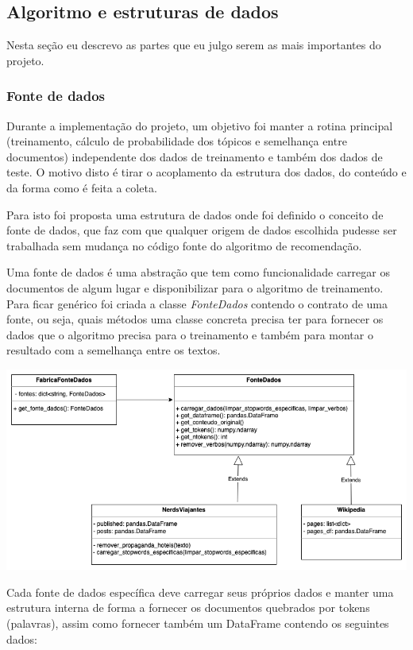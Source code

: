 \subsection{Algoritmo e estruturas de dados}

Nesta seção eu descrevo as partes que eu julgo serem as mais importantes do projeto.

\subsubsection{Fonte de dados}
Durante a implementação do projeto, um objetivo foi manter a rotina principal (treinamento, cálculo de probabilidade dos tópicos e semelhança entre documentos) independente dos dados de treinamento e também dos dados de teste. O motivo disto é tirar o acoplamento da estrutura dos dados, do conteúdo e da forma como é feita a coleta.

Para isto foi proposta uma estrutura de dados onde foi definido o conceito de fonte de dados, que faz com que qualquer origem de dados escolhida pudesse ser trabalhada sem mudança no código fonte do algoritmo de recomendação.

Uma fonte de dados é uma abstração que tem como funcionalidade carregar os documentos de algum lugar e disponibilizar para o algoritmo de treinamento. Para ficar genérico foi criada a classe \textit{FonteDados} contendo o contrato de uma fonte, ou seja, quais métodos uma classe concreta precisa ter para fornecer os dados que o algoritmo precisa para o treinamento e também para montar o resultado com a semelhança entre os textos.

\includegraphics[scale=0.5]{diagramas/fonte_dados.png}

Cada fonte de dados específica deve carregar seus próprios dados e manter uma estrutura interna de forma a fornecer os documentos quebrados por 
tokens (palavras), assim como fornecer também um DataFrame contendo os seguintes dados:

